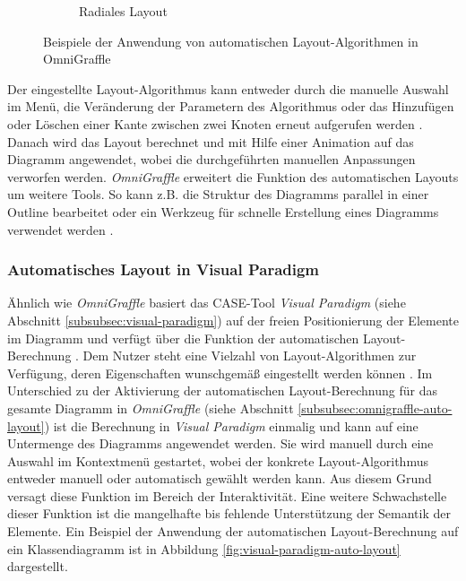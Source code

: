 \begin{figure}[hbt]
\begin{subfigure}{\subfigureshortwidth}
        \caption{Radiales Layout}
        \label{fig:omnigraffle-automatic-layout-f}
    \end{subfigure}
    \caption{Beispiele der Anwendung von automatischen Layout-Algorithmen in OmniGraffle}
    \label{fig:omnigraffle-automatic-layout}
\end{figure}

Der eingestellte Layout-Algorithmus kann entweder durch die manuelle Auswahl im Menü, die Veränderung der Parametern des Algorithmus oder das Hinzufügen oder Löschen einer Kante zwischen zwei Knoten erneut aufgerufen werden \cite[S.43]{Wybrow08Using}. Danach wird das Layout berechnet und mit Hilfe einer Animation auf das Diagramm angewendet, wobei die durchgeführten manuellen Anpassungen verworfen werden. \textit{OmniGraffle} erweitert die Funktion des automatischen Layouts um weitere Tools. So kann z.B. die Struktur des Diagramms parallel in einer Outline bearbeitet oder ein Werkzeug für schnelle Erstellung eines Diagramms verwendet werden \cite{08OmniGraffle}.

\subsubsection{Automatisches Layout in Visual Paradigm}

Ähnlich wie \textit{OmniGraffle} basiert das CASE-Tool \textit{Visual Paradigm} (siehe Abschnitt \ref{subsubsec:visual-paradigm}) auf der freien Positionierung der Elemente im Diagramm und verfügt über die Funktion der automatischen Layout-Berechnung \cite{14Visual}. Dem Nutzer steht eine Vielzahl von Layout-Algorithmen zur Verfügung, deren Eigenschaften wunschgemäß eingestellt werden können \cite{Fuhrmann11On-the-Pragmatics}. Im Unterschied zu der Aktivierung der automatischen Layout-Berechnung für das gesamte Diagramm in \textit{OmniGraffle} (siehe Abschnitt \ref{subsubsec:omnigraffle-auto-layout}) ist die Berechnung in \textit{Visual Paradigm} einmalig und kann auf eine Untermenge des Diagramms angewendet werden. Sie wird manuell durch eine Auswahl im Kontextmenü gestartet, wobei der konkrete Layout-Algorithmus entweder manuell oder automatisch gewählt werden kann. Aus diesem Grund versagt diese Funktion im Bereich der Interaktivität. Eine weitere Schwachstelle dieser Funktion ist die mangelhafte bis fehlende Unterstützung der Semantik der Elemente. Ein Beispiel der Anwendung der automatischen Layout-Berechnung auf ein Klassendiagramm ist in Abbildung \ref{fig:visual-paradigm-auto-layout} dargestellt.

